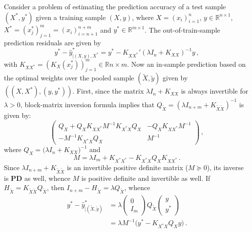 \documentclass{ITaSconf}
\newcommand{\Real}{\mathbb{R}}
\begin{document}
Consider a problem of estimating the prediction accuracy of a test sample $(X^*, y^*)$
given a training sample $(X, y)$, where $X = (x_i)_{i=1}^n$, $y\in \Real^{n\times 1}$,
$X^* = (x^*_j)_{j=1}^m = (x_i)_{i=n+1}^{n+m}$ and $y^*\in \Real^{m\times 1}$. 
The out-of-train-sample prediction residuals are given by
\begin{equation*}
  y^* - \hat{y}^*_{|(X, y), X^*}
    = y^* - K_{XX^*}' (\lambda I_n + K_{XX})^{-1} y
    \,,
\end{equation*}
with $K_{XX^*} = (K_X(x^*_j))_{j=1}^m \in \Real{n\times m}$.
Now an in-sample prediction based on the optimal weights over the pooled sample
$(\tilde{X}, \tilde{y})$ given by $((X, X^*), (y, y^*))$. First, since the matrix
$\lambda I_n + K_{XX}$ is always invertible for $\lambda > 0$, block-matrix inversion
formula implies that $Q_{\tilde{X}} = (\lambda I_{n+m} + K_{\tilde{X}\tilde{X}})^{-1}$
is given by:
\begin{equation*}
  \begin{pmatrix}
    Q_X + Q_X K_{XX^*} M^{-1} K_{X^*X} Q_X & - Q_X K_{XX^*} M^{-1} \\
    - M^{-1} K_{X^*X} Q_X & M^{-1}
  \end{pmatrix}
  \,,
\end{equation*}
where $Q_X = \bigl( \lambda I_n + K_{XX} \bigr)^{-1}$ and
\begin{equation*}
  M = \lambda I_m + K_{X^*X^*} - K_{X^*X} Q_X K_{XX^*} \,.
\end{equation*}
Since $\lambda I_{n+m} + K_{\tilde{X}\tilde{X}}$ is an invertible positive definite
matrix ($M\succeq 0$), its inverse is \textbf{PD} as well, whence $M$ is positive
definite and invertible as well. If $H_{\tilde{X}} = K_{\tilde{X}\tilde{X}} Q_{\tilde{X}}$,
then $I_{n+m} - H_{\tilde{X}} = \lambda Q_{\tilde{X}}$, whence
\begin{align}
  y^* - \hat{y}^*_{|(\tilde{X}, \tilde{y})}
    &= \lambda \begin{pmatrix} 0\\ I_m \end{pmatrix} Q_{\tilde{X}}
        \begin{pmatrix} y\\ y^* \end{pmatrix} \nonumber \\
    &= \lambda M^{-1} \bigl( y^* - K_{X^*X} Q_X y \bigr) %
    \label{eq:holdout_resid}
    \,.
\end{align}
\end{document}
